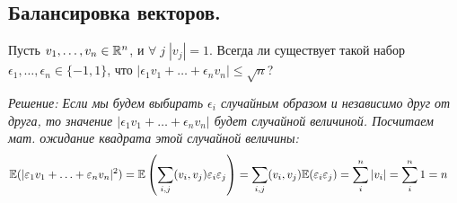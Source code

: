 \subsection{Балансировка векторов.}
\begin{problem}
    Пусть $v_1, \ldots, v_n \in \mathbb{R}^n$, и $\forall\;j\; |v_j| = 1$. Всегда ли существует такой набор
    $\epsilon_1, \ldots, \epsilon_n \in \{-1, 1\}$, что $|\epsilon_1v_1 + \ldots + \epsilon_nv_n| \leq \sqrt{n}$?

    \it{Решение:} Если мы будем выбирать $\epsilon_i$ случайным образом и независимо друг от друга,
    то значение $|\epsilon_1v_1 + \ldots + \epsilon_nv_n|$ будет случайной величиной.
    Посчитаем мат. ожидание квадрата этой случайной величины:
    \begin{align*}
        &\mathbb{E}(|\varepsilon_1v_1 + \ldots + \varepsilon_nv_n|^2) = \mathbb{E}\left( \sum\limits_{i, j} (v_i, v_j) \varepsilon_i\varepsilon_j \right)
        =\sum\limits_{i, j} (v_i, v_j) \mathbb{E}(\varepsilon_i\varepsilon_j) = \sum\limits_{i}^n |v_i| = \sum\limits_{i}^n 1 = n
    \end{align*}
\end{problem}
\begin{comment}
    По определению длины вектора: $|v| = \sqrt{(v, v)}$, т.е.
    \[
        \left| \sum\limits_{j} \epsilon_{j}v_j \right|^2 =
        \sqrt{\left( \sum\limits_{i} \epsilon_{i}v_i, \sum\limits_{j} \epsilon_{j}v_j \right)^2} =
        \left( \sum\limits_{i} \epsilon_{i}v_i, \sum\limits_{j} \epsilon_{j}v_j \right) =
        \sum\limits_{i, j} (v_i, v_j) \epsilon_i\epsilon_j
    \]
    Заметим так же, что при $i \neq j$ мы имеем $\EE(\epsilon_i\epsilon_j) = \EE(\epsilon_i)\EE(\epsilon_j)$
    (в силу независимости выбора $\epsilon_i$) и $\EE(\epsilon_i)\EE(\epsilon_j) =
    \left( 1\cdot\frac{1}{2} + (-1)\cdot\frac{1}{2} \right) \cdot 2 = 0$
    в силу того, что мы выбираем $\epsilon_i$ равновероятно с вероятностью
    выбора $\frac{1}{2}$.

    С другой стороны, при $i = j$ имеем $\sum\limits_{i} (v_i, v_i) = |v_i|^2$ и $\EE(\epsilon_i)\EE(\epsilon_i) =
    \EE(\epsilon_i^2) = 1$.
\end{comment}

